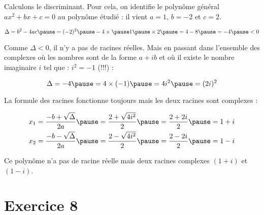 \documentclass[9pt,professionalfonts,handout,hyperref]{beamer}
\begin{document}
\begin{frame}

Calculons le discriminant. \pause Pour cela, on identifie le polynôme général $ax^{2} + bx +c=0$ au polynôme étudié : \pause il vient $a = 1$, \pause $ b=-2$ \pause et $c=2$. 

\[
\Delta = b^2 -4ac \pause = (-2)^2\pause -4\times \pause 1 \pause \times 2 \pause = 4-8 \pause = -4 \pause <0
\]

Comme $\Delta<0$, il n'y a pas de racines réelles. \pause Mais en passant dans l'ensemble des complexes \pause où les nombres sont de la forme $a+ib$ \pause et où il existe le nombre imaginaire $i$ \pause tel que : $i^2=-1$ (!!!) : 

\[
\Delta = -4 \pause = 4\times (-1) \pause = 4i^2 \pause = (2i)^2 
\]

\pause La formule des racines fonctionne toujours mais les deux racines sont complexes : 

\[\begin{aligned}
&x_1 = \frac{-b + \sqrt{\Delta}}{2a} \pause = \frac{2 + \sqrt{4i^2}}{2}\pause = \frac{2 + 2i}{2} \pause = 1+i\\
&x_2 = \frac{-b - \sqrt{\Delta}}{2a} \pause = \frac{2 - \sqrt{4i^2}}{2} \pause = \frac{2 - 2i}{2} \pause = 1-i\\
\end{aligned}\]

\pause Ce polynôme n'a pas de racine réelle \pause mais deux racines complexes $(1+i)$ et $(1-i)$.

\end{frame}

\section{Exercice 8}

%
\end{document}
